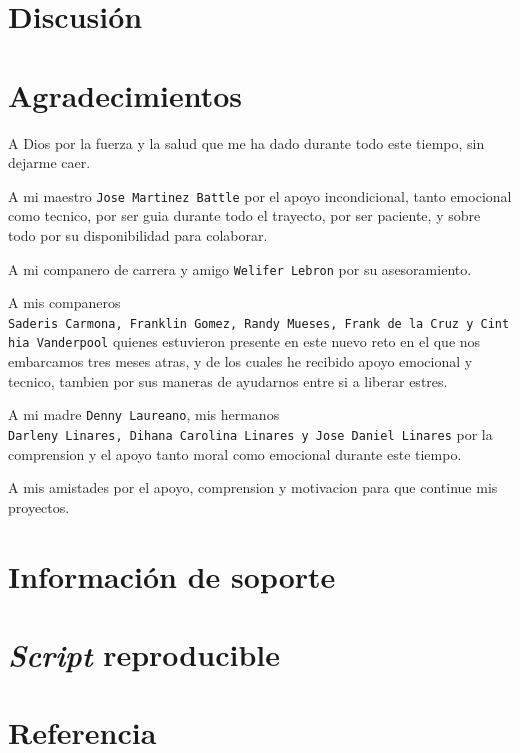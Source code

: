 \documentclass[11pt,]{article}
\begin{document}
\section{Discusión}\label{discusiuxf3n}

\section{Agradecimientos}\label{agradecimientos}

A Dios por la fuerza y la salud que me ha dado durante todo este tiempo,
sin dejarme caer.

A mi maestro \texttt{Jose\ Martinez\ Battle} por el apoyo incondicional,
tanto emocional como tecnico, por ser guia durante todo el trayecto, por
ser paciente, y sobre todo por su disponibilidad para colaborar.

A mi companero de carrera y amigo \texttt{Welifer\ Lebron} por su
asesoramiento.

A mis companeros
\texttt{Saderis\ Carmona,\ Franklin\ Gomez,\ Randy\ Mueses,\ Frank\ de\ la\ Cruz\ y\ Cinthia\ Vanderpool}
quienes estuvieron presente en este nuevo reto en el que nos embarcamos
tres meses atras, y de los cuales he recibido apoyo emocional y tecnico,
tambien por sus maneras de ayudarnos entre si a liberar estres.

A mi madre \texttt{Denny\ Laureano}, mis hermanos
\texttt{Darleny\ Linares,\ Dihana\ Carolina\ Linares\ y\ Jose\ Daniel\ Linares}
por la comprension y el apoyo tanto moral como emocional durante este
tiempo.

A mis amistades por el apoyo, comprension y motivacion para que continue
mis proyectos.

\section{Información de soporte}\label{informaciuxf3n-de-soporte}

\section{\texorpdfstring{\emph{Script}
reproducible}{Script reproducible}}\label{script-reproducible}

\section*{Referencia}\label{referencia}
\end{document}
